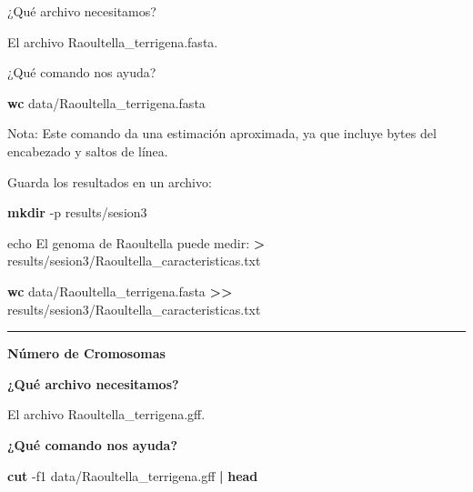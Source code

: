 \documentclass[
]{book}
\newenvironment{Shaded}{\begin{snugshade}}{\end{snugshade}}
\newcommand{\AttributeTok}[1]{\textcolor[rgb]{0.13,0.29,0.53}{#1}}
\newcommand{\BuiltInTok}[1]{#1}
\newcommand{\FunctionTok}[1]{\textcolor[rgb]{0.13,0.29,0.53}{\textbf{#1}}}
\newcommand{\KeywordTok}[1]{\textcolor[rgb]{0.13,0.29,0.53}{\textbf{#1}}}
\newcommand{\NormalTok}[1]{#1}
\newcommand{\OperatorTok}[1]{\textcolor[rgb]{0.81,0.36,0.00}{\textbf{#1}}}
\newcommand{\StringTok}[1]{\textcolor[rgb]{0.31,0.60,0.02}{#1}}
\begin{document}
¿Qué archivo necesitamos?

El archivo Raoultella\_terrigena.fasta.

¿Qué comando nos ayuda?

\begin{Shaded}
\begin{Highlighting}[]
\FunctionTok{wc}\NormalTok{ data/Raoultella\_terrigena.fasta}
\end{Highlighting}
\end{Shaded}

Nota: Este comando da una estimación aproximada, ya que incluye bytes del encabezado y saltos de línea.

Guarda los resultados en un archivo:

\begin{Shaded}
\begin{Highlighting}[]
\FunctionTok{mkdir} \AttributeTok{{-}p}\NormalTok{ results/sesion3}
\end{Highlighting}
\end{Shaded}

\begin{Shaded}
\begin{Highlighting}[]
\BuiltInTok{echo} \StringTok{\textquotesingle{}El genoma de Raoultella puede medir:\textquotesingle{}} \OperatorTok{\textgreater{}}\NormalTok{ results/sesion3/Raoultella\_caracteristicas.txt}
\end{Highlighting}
\end{Shaded}

\begin{Shaded}
\begin{Highlighting}[]
\FunctionTok{wc}\NormalTok{ data/Raoultella\_terrigena.fasta }\OperatorTok{\textgreater{}\textgreater{}}\NormalTok{ results/sesion3/Raoultella\_caracteristicas.txt}
\end{Highlighting}
\end{Shaded}

\begin{center}\rule{0.5\linewidth}{0.5pt}\end{center}

\textbf{Número de Cromosomas}

\textbf{¿Qué archivo necesitamos?}

El archivo Raoultella\_terrigena.gff.

\textbf{¿Qué comando nos ayuda?}

\begin{Shaded}
\begin{Highlighting}[]
\FunctionTok{cut} \AttributeTok{{-}f1}\NormalTok{ data/Raoultella\_terrigena.gff }\KeywordTok{|} \FunctionTok{head}
\end{Highlighting}
\end{Shaded}
\end{document}
